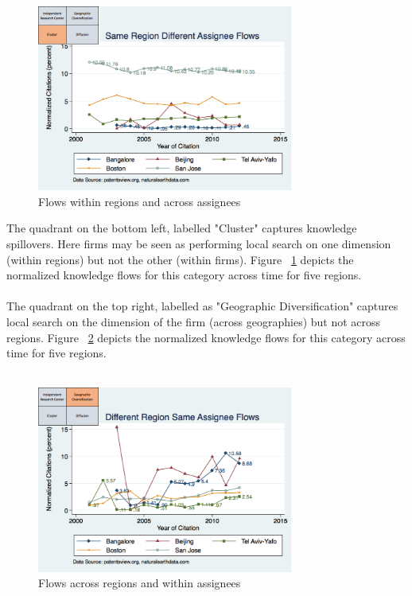 \documentclass[12pt]{article}
\begin{document}
\begin{figure}[h!]
\begin{centering}
  \includegraphics[width=0.75\textwidth]{SMSSameRegionDiffAssigneeFlows}
  \caption{Flows within regions and across assignees}
  \label{fig:SMSSameRegionDiffAssigneeFlows}
\end{centering}
\end{figure}
The quadrant on the bottom left, labelled "Cluster" captures knowledge spillovers. Here firms may be seen as performing local search on one dimension (within regions) but not the other (within firms). Figure ~\ref{fig:SMSSameRegionDiffAssigneeFlows} depicts the normalized knowledge flows for this category across time for five regions.
\\\\
The quadrant on the top right, labelled as "Geographic Diversification" captures local search on the dimension of the firm (across geographies) but not across regions. Figure ~\ref{fig:SMSDiffRegionSameAssigneeFlows} depicts the normalized knowledge flows for this category across time for five regions.
\\\\
\begin{figure}[h!]
\begin{centering}
  \includegraphics[width=0.75\textwidth]{SMSDiffRegionSameAssigneeFlows}
  \caption{Flows across regions and within assignees}
  \label{fig:SMSDiffRegionSameAssigneeFlows}
\end{centering}
\end{figure}
\end{document}
